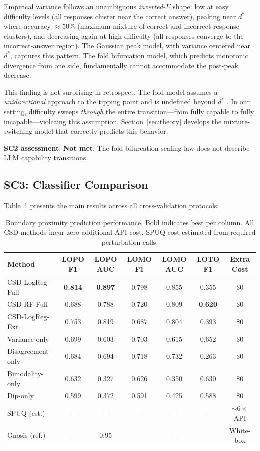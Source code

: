 \documentclass[11pt,letterpaper]{article}
\begin{document}
Empirical variance follows an unambiguous \emph{inverted-U} shape: low at easy difficulty levels (all responses cluster near the correct answer), peaking near $d^*$ where accuracy $\approx 50\%$ (maximum mixture of correct and incorrect response clusters), and decreasing again at high difficulty (all responses converge to the incorrect-answer region). The Gaussian peak model, with variance centered near $d^*$, captures this pattern. The fold bifurcation model, which predicts monotonic divergence from one side, fundamentally cannot accommodate the post-peak decrease.

This finding is not surprising in retrospect. The fold model assumes a \emph{unidirectional} approach to the tipping point and is undefined beyond $d^*$ \cite{kuehn2011}. In our setting, difficulty sweeps \emph{through} the entire transition---from fully capable to fully incapable---violating this assumption. Section~\ref{sec:theory} develops the mixture-switching model that correctly predicts this behavior.

\textbf{SC2 assessment}: \textbf{Not met}. The fold bifurcation scaling law does not describe LLM capability transitions.

\subsection{SC3: Classifier Comparison}

Table~\ref{tab:main} presents the main results across all cross-validation protocols:

\begin{table}[h]
\centering
\caption{Boundary proximity prediction performance. Bold indicates best per column. All CSD methods incur zero additional API cost. SPUQ cost estimated from required perturbation calls.}
\label{tab:main}
\small
\begin{tabular}{lcccccc}
\toprule
Method & LOPO F1 & LOPO AUC & LOMO F1 & LOMO AUC & LOTO F1 & Extra Cost \\
\midrule
CSD-LogReg-Full & \textbf{0.814} & \textbf{0.897} & 0.798 & 0.855 & 0.355 & \$0 \\
CSD-RF-Full & 0.688 & 0.788 & 0.720 & 0.809 & \textbf{0.620} & \$0 \\
CSD-LogReg-Ext & 0.753 & 0.819 & 0.687 & 0.804 & 0.393 & \$0 \\
Variance-only & 0.699 & 0.603 & 0.703 & 0.615 & 0.652 & \$0 \\
Disagreement-only & 0.684 & 0.694 & 0.718 & 0.732 & 0.263 & \$0 \\
Bimodality-only & 0.632 & 0.327 & 0.626 & 0.350 & 0.630 & \$0 \\
Dip-only & 0.599 & 0.372 & 0.591 & 0.425 & 0.588 & \$0 \\
SPUQ (est.) & --- & --- & --- & --- & --- & ${\sim}6\times$ API \\
Gnosis (ref.) & --- & 0.95 & --- & --- & --- & White-box \\
\bottomrule
\end{tabular}
\end{table}
\end{document}

